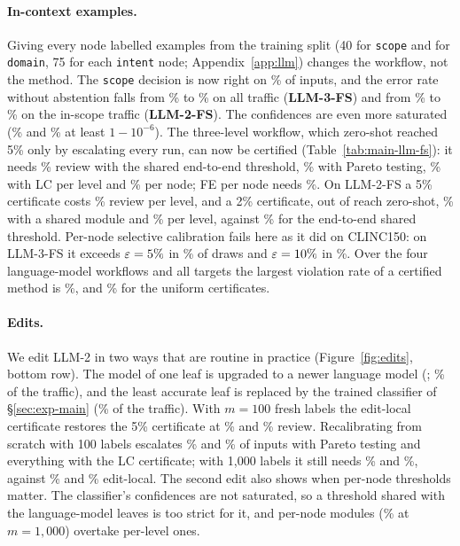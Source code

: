 \paragraph{In-context examples.} Giving every node labelled examples from the training split
(40 for \texttt{scope} and for \texttt{domain}, 75 for each \texttt{intent} node;
Appendix~\ref{app:llm}) changes the workflow, not the method. The \texttt{scope} decision is
now right on \LlmRootAccG\% of inputs, and the error rate without abstention falls from
\FreeErrLlmThree\% to \FreeErrLlmThreeFs\% on all traffic (\textbf{LLM-3-FS}) and from
\FreeErrLlm\% to \FreeErrLlmFs\% on the in-scope traffic (\textbf{LLM-2-FS}). The confidences
are even more saturated (\LlmSaturatedG\% and \LlmSaturatedF\% at least $1-10^{-6}$). The
three-level workflow, which zero-shot reached 5\% only by escalating every run, can now be
certified
(Table~\ref{tab:main-llm-fs}): it needs \RevGSharedFive\% review with the shared end-to-end
threshold, \RevGParetoFive\% with Pareto testing, \RevGLClevelFive\% with LC per level and
\RevGLCnodeFive\% per node; FE per node needs \RevGFEnodeFive\%. On LLM-2-FS a 5\%
certificate costs \RevFLClevelFive\% review per level, and a 2\% certificate, out of reach
zero-shot, \RevFLCsharedTwo\% with a shared module and \RevFLClevelTwo\% per level, against
\RevFSharedTwo\% for the end-to-end shared threshold. Per-node selective calibration fails
here as it did on CLINC150: on LLM-3-FS it exceeds $\varepsilon=5\%$ in \ViolGPerNodeFive\% of
draws and $\varepsilon=10\%$ in \ViolGPerNodeTen\%. Over the four language-model workflows and all
targets the largest violation rate of a certified method is \MaxViolCertifiedLlm\%, and
\MaxViolUniformLlm\% for the uniform certificates.

\paragraph{Edits.} We edit LLM-2 in two ways that are routine in practice
(Figure~\ref{fig:edits}, bottom row). The model of one leaf is upgraded to a newer language
model (\texttt{\LlmUpgrade}; \EditShareLUpgrade\% of the traffic), and the least accurate leaf
is replaced by the trained classifier of \S\ref{sec:exp-main} (\EditShareLClassifier\% of the
traffic). With $m=100$ fresh labels the edit-local certificate restores the 5\% certificate
at \EditLUpgradeLocalHundred\% and \EditLClassifierLocalHundred\% review. Recalibrating from
scratch with 100 labels escalates \EditLUpgradeScratchHundred\% and
\EditLClassifierScratchHundred\% of inputs with Pareto testing and everything with the LC
certificate; with 1{,}000 labels it still needs \EditLUpgradeScratchLCThousand\% and
\EditLClassifierScratchLCThousand\%, against \EditLUpgradeLocalThousand\% and
\EditLClassifierLocalThousand\% edit-local. The second edit also shows when per-node
thresholds matter. The classifier's confidences are not saturated, so a threshold shared
with the language-model leaves is too strict for it, and per-node modules
(\EditLClassifierLocalNodeThousand\% at $m=1{,}000$) overtake per-level ones.


